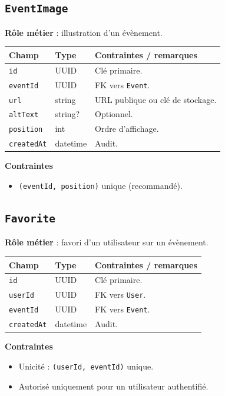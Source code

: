 \documentclass[11pt,a4paper]{article}
\begin{document}
\subsection{\texttt{EventImage}}
\textbf{Rôle métier} : illustration d’un évènement.

\begin{longtable}{@{}p{}p{}p{}@{}}
\toprule
\textbf{Champ} & \textbf{Type} & \textbf{Contraintes / remarques}\\
\midrule
\endhead
\texttt{id} & UUID & Clé primaire.\\
\texttt{eventId} & UUID & FK vers \texttt{Event}.\\
\texttt{url} & string & URL publique ou clé de stockage.\\
\texttt{altText} & string? & Optionnel.\\
\texttt{position} & int & Ordre d’affichage.\\
\texttt{createdAt} & datetime & Audit.\\
\bottomrule
\end{longtable}

\textbf{Contraintes}
\begin{itemize}
  \item \texttt{(eventId, position)} unique (recommandé).
\end{itemize}

\subsection{\texttt{Favorite}}
\textbf{Rôle métier} : favori d’un utilisateur sur un évènement.

\begin{longtable}{@{}p{}p{}p{}@{}}
\toprule
\textbf{Champ} & \textbf{Type} & \textbf{Contraintes / remarques}\\
\midrule
\endhead
\texttt{id} & UUID & Clé primaire.\\
\texttt{userId} & UUID & FK vers \texttt{User}.\\
\texttt{eventId} & UUID & FK vers \texttt{Event}.\\
\texttt{createdAt} & datetime & Audit.\\
\bottomrule
\end{longtable}

\textbf{Contraintes}
\begin{itemize}
  \item Unicité : \texttt{(userId, eventId)} unique.
  \item Autorisé uniquement pour un utilisateur authentifié.
\end{itemize}
\end{document}
